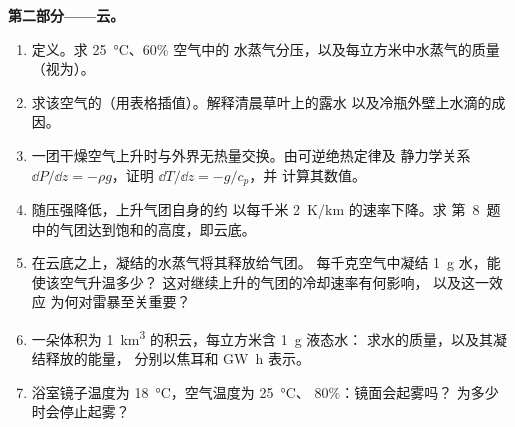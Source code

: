 \begin{problem}
\medskip
\noindent\textbf{第二部分——云。}
\begin{enumerate}[resume]
  \item 定义。求 \qty{25}{\degreeCelsius}、$60\%$ 空气中的
        水蒸气分压，以及每立方米中水蒸气的质量
        （视为）。
  \item 求该空气的（用表格插值）。解释清晨草叶上的露水
        以及冷瓶外壁上水滴的成因。
  \item 一团干燥空气上升时与外界无热量交换。由可逆绝热定律及
        静力学关系
        $\dd P/\dd z = -\rho g$，证明 $\dd T/\dd z = -g/c_p$，并
        计算其数值。
  \item 随压强降低，上升气团自身的约
        以每千米 \qty{2}{K/km} 的速率下降。求
        第~8~题中的气团达到饱和的高度，即云底。
  \item 在云底之上，凝结的水蒸气将其释放给气团。
        每千克空气中凝结 \qty{1}{g} 水，能使该空气升温多少？
        这对继续上升的气团的冷却速率有何影响，
        以及这一效应
        为何对雷暴至关重要？
  \item 一朵体积为 \qty{1}{km^3} 的积云，每立方米含 \qty{1}{g} 液态水：
        求水的质量，以及其凝结释放的能量，
        分别以焦耳和 \unit{GW h} 表示。
  \item 浴室镜子温度为 \qty{18}{\degreeCelsius}，空气温度为
        \qty{25}{\degreeCelsius}、 $80\%$：镜面会起雾吗？
        为多少时会停止起雾？
\end{enumerate}


\end{problem}
